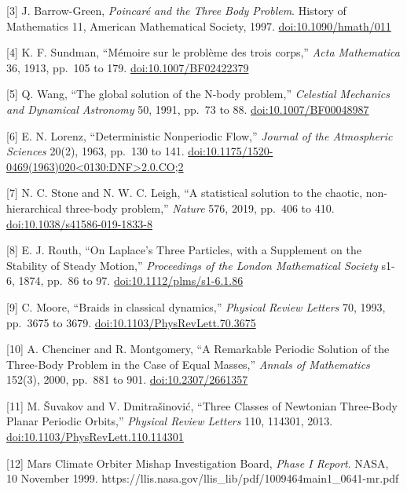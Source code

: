 \documentclass[
  10pt,
]{article}
\begin{document}
{[}3{]} J. Barrow-Green, \emph{Poincaré and the Three Body Problem}.
History of Mathematics 11, American Mathematical Society, 1997.
\href{https://doi.org/10.1090/hmath/011}{doi:10.1090/hmath/011}

{[}4{]} K. F. Sundman, ``Mémoire sur le problème des trois corps,''
\emph{Acta Mathematica} 36, 1913, pp.~105 to 179.
\href{https://doi.org/10.1007/BF02422379}{doi:10.1007/BF02422379}

{[}5{]} Q. Wang, ``The global solution of the N-body problem,''
\emph{Celestial Mechanics and Dynamical Astronomy} 50, 1991, pp.~73 to
88. \href{https://doi.org/10.1007/BF00048987}{doi:10.1007/BF00048987}

{[}6{]} E. N. Lorenz, ``Deterministic Nonperiodic Flow,'' \emph{Journal
of the Atmospheric Sciences} 20(2), 1963, pp.~130 to 141.
\href{https://doi.org/10.1175/1520-0469(1963)020\%3C0130:DNF\%3E2.0.CO;2}{doi:10.1175/1520-0469(1963)020\textless0130:DNF\textgreater2.0.CO;2}

{[}7{]} N. C. Stone and N. W. C. Leigh, ``A statistical solution to the
chaotic, non-hierarchical three-body problem,'' \emph{Nature} 576, 2019,
pp.~406 to 410.
\href{https://doi.org/10.1038/s41586-019-1833-8}{doi:10.1038/s41586-019-1833-8}

{[}8{]} E. J. Routh, ``On Laplace's Three Particles, with a Supplement
on the Stability of Steady Motion,'' \emph{Proceedings of the London
Mathematical Society} s1-6, 1874, pp.~86 to 97.
\href{https://doi.org/10.1112/plms/s1-6.1.86}{doi:10.1112/plms/s1-6.1.86}

{[}9{]} C. Moore, ``Braids in classical dynamics,'' \emph{Physical
Review Letters} 70, 1993, pp.~3675 to 3679.
\href{https://doi.org/10.1103/PhysRevLett.70.3675}{doi:10.1103/PhysRevLett.70.3675}

{[}10{]} A. Chenciner and R. Montgomery, ``A Remarkable Periodic
Solution of the Three-Body Problem in the Case of Equal Masses,''
\emph{Annals of Mathematics} 152(3), 2000, pp.~881 to 901.
\href{https://doi.org/10.2307/2661357}{doi:10.2307/2661357}

{[}11{]} M. Šuvakov and V. Dmitrašinović, ``Three Classes of Newtonian
Three-Body Planar Periodic Orbits,'' \emph{Physical Review Letters} 110,
114301, 2013.
\href{https://doi.org/10.1103/PhysRevLett.110.114301}{doi:10.1103/PhysRevLett.110.114301}

{[}12{]} Mars Climate Orbiter Mishap Investigation Board, \emph{Phase I
Report}. NASA, 10 November 1999.
https://llis.nasa.gov/llis\_lib/pdf/1009464main1\_0641-mr.pdf
\end{document}
